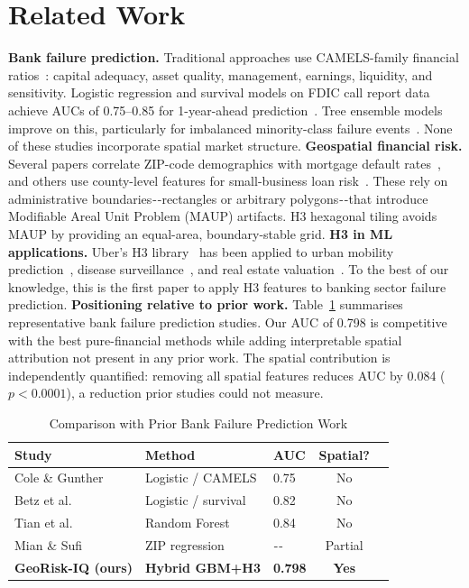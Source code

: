 \documentclass[conference]{IEEEtran}
\begin{document}
\section{Related Work}
\textbf{Bank failure prediction.}
Traditional approaches use CAMELS-family financial ratios~\cite{cole1998}:
capital adequacy, asset quality, management, earnings, liquidity, and
sensitivity. Logistic regression and survival models on FDIC call report
data achieve AUCs of 0.75–0.85 for 1-year-ahead
prediction~\cite{betz2014}. Tree ensemble models improve on this,
particularly for imbalanced minority-class failure
events~\cite{tian2015}. None of these studies incorporate spatial market
structure.
\textbf{Geospatial financial risk.}
Several papers correlate ZIP-code demographics with mortgage default
rates~\cite{mian2009}, and others use county-level features for
small-business loan risk~\cite{bhutta2013}. These rely on administrative
boundaries - -rectangles or arbitrary polygons - -that introduce Modifiable
Areal Unit Problem (MAUP) artifacts. H3 hexagonal tiling avoids MAUP by
providing an equal-area, boundary-stable grid.
\textbf{H3 in ML applications.}
Uber's H3 library~\cite{brodsky2018h3} has been applied to urban mobility
prediction~\cite{liu2023}, disease surveillance~\cite{bhatt2015}, and
real estate valuation~\cite{jessee2023}. To the best of our knowledge,
this is the first paper to apply H3 features to banking sector failure
prediction.
\textbf{Positioning relative to prior work.}
Table~\ref{tab:prior_work} summarises representative bank failure
prediction studies. Our AUC of 0.798 is competitive with the best
pure-financial methods while adding interpretable spatial attribution
not present in any prior work. The spatial contribution is independently
quantified: removing all spatial features reduces AUC by 0.084
($p < 0.0001$), a reduction prior studies could not measure.
\begin{table}[t]
\caption{Comparison with Prior Bank Failure Prediction Work}
\label{tab:prior_work}
\centering
\begin{tabular}{lllcc}
\toprule
Study & Method & AUC & Spatial? \\
\midrule
Cole \& Gunther~\cite{cole1998} & Logistic / CAMELS & 0.75 & No \\
Betz et al.~\cite{betz2014} & Logistic / survival & 0.82 & No \\
Tian et al.~\cite{tian2015} & Random Forest & 0.84 & No \\
Mian \& Sufi~\cite{mian2009} & ZIP regression & - - & Partial \\
\textbf{GeoRisk-IQ (ours)} & \textbf{Hybrid GBM+H3} & \textbf{0.798} & \textbf{Yes} \\
\bottomrule
\end{tabular}
\end{table}
\end{document}

